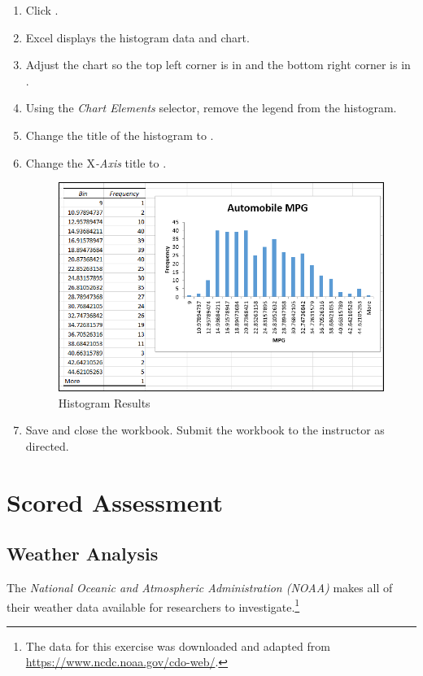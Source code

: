 \begin{enumerate}[resume]
	\item Click .
	\item Excel displays the histogram data and chart. 
	\item Adjust the chart so the top left corner is in  and the bottom right corner is in .
	\item Using the \textit{Chart Elements} selector, remove the legend from the histogram.
	\item Change the title of the histogram to .
	\item Change the X\textit{-Axis} title to .

	\begin{figure}[H]
		\centering
		\includegraphics[width=\maxwidth{.95\linewidth}]{gfx/ch09_fig77}
		\caption{Histogram Results}
		\label{09:fig77}
	\end{figure}
	
	\item Save and close the  workbook. Submit the workbook to the instructor as directed.

\end{enumerate}


\section{Scored Assessment}

\subsection{Weather Analysis}

The \textit{National Oceanic and Atmospheric Administration (NOAA)} makes all of their weather data available for researchers to investigate.\footnote{The data for this exercise was downloaded and adapted from \url{https://www.ncdc.noaa.gov/cdo-web/}.}

